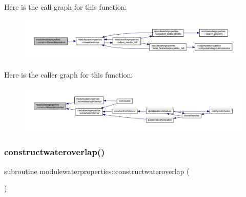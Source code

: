 Here is the call graph for this function\+:\nopagebreak
\begin{figure}[H]
\begin{center}
\leavevmode
\includegraphics[width=350pt]{namespacemodulewaterproperties_affcb95213dcebf7b3e1fe53b349d50b6_cgraph}
\end{center}
\end{figure}
Here is the caller graph for this function\+:\nopagebreak
\begin{figure}[H]
\begin{center}
\leavevmode
\includegraphics[width=350pt]{namespacemodulewaterproperties_affcb95213dcebf7b3e1fe53b349d50b6_icgraph}
\end{center}
\end{figure}
\mbox{\label{namespacemodulewaterproperties_a1c2eaa3c5cb93a51e2756820277cef75}} 
\subsubsection{\texorpdfstring{constructwateroverlap()}{constructwateroverlap()}}
{\footnotesize\ttfamily subroutine modulewaterproperties\+::constructwateroverlap (\begin{DoxyParamCaption}{ }\end{DoxyParamCaption})\hspace{0.3cm}{\ttfamily [private]}}


